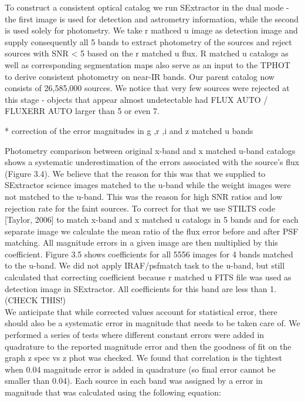 \documentclass[numberedappendix,apj,twocolumn]{emulateapj}
\begin{document}
To construct a consistent optical catalog we run SExtractor in the dual mode - the first image is used for detection and astrometry information, while the second is used solely for photometry. We take r mathced u image as detection image and supply consequently all 5 bands to extract photometry of the sources and reject sources with SNR < 5 based on the r matched u flux. R matched u catalogs as well as corresponding segmentation maps also serve as an input to the TPHOT to derive consistent photometry on near-IR bands. Our parent catalog now consists of 26,585,000 sources. We notice that very few sources were
rejected at this stage - objects that appear almost undetectable had FLUX AUTO / FLUXERR AUTO larger than 5 or even 7. 

 *	correction of the error magnitudes in g ,r ,i  and z matched u bands

Photometry comparison between original x-band and x matched u-band catalogs
shows a systematic underestimation of the errors associated with the source's flux
(Figure 3.4). We believe that the reason for this was that we supplied to SExtractor science images matched to the u-band while the weight images were not matched to the u-band. This was the reason for high SNR ratios and low rejection rate for the faint sources.
To correct for that we use STILTS code [Taylor, 2006] to match x-band
and x matched u catalogs in 5 bands and for each separate image we calculate the
mean ratio of the flux error before and after PSF matching. All magnitude errors in a given
image are then multiplied by this coefficient. Figure 3.5 shows coefficients for all 5556 images for 4 bands matched to the u-band. We did not apply IRAF/psfmatch task to the u-band, but still calculated that correcting coefficient because r matched u FITS file was used as detection image in SExtractor. All coefficients for this band are less than 1. (CHECK THIS!)
\\
We anticipate that while corrected values account for statistical error, there should
also be a systematic error in magnitude that needs to be taken care of. We performed
a series of tests where different constant errors were added in quadrature to the
reported magnitude error and then the goodness of fit on the graph z spec vs z phot
was checked. We found that correlation is the tightest when 0.04 magnitude error
is added in quadrature (so final error cannot be smaller than 0.04). Each
source in each band was assigned by a error in magnitude that was calculated using the following equation:
\end{document}
